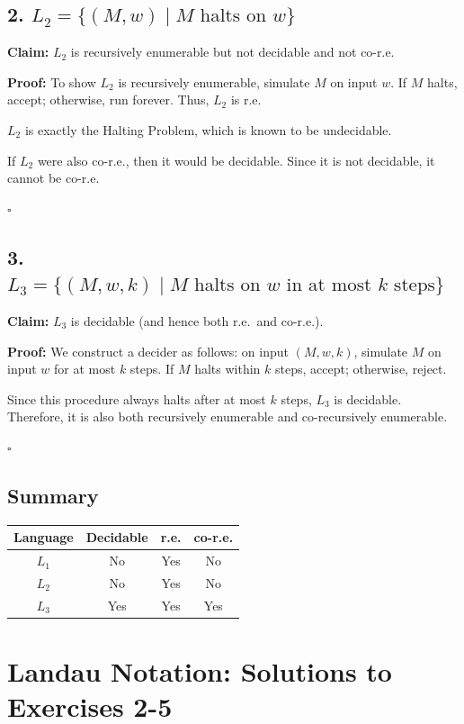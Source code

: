 \documentclass{article}
\theoremstyle{theorem}
\theoremstyle{definition}
\theoremstyle{remark}
\begin{document}
\subsection*{2. $L_2 = \{ (M,w) \mid M \text{ halts on } w \}$}

\textbf{Claim:} $L_2$ is recursively enumerable but not decidable and not co-r.e.

\textbf{Proof:}
To show $L_2$ is recursively enumerable, simulate $M$ on input $w$. If $M$ halts, accept; otherwise, run forever. Thus, $L_2$ is r.e.

$L_2$ is exactly the Halting Problem, which is known to be undecidable.

If $L_2$ were also co-r.e., then it would be decidable. Since it is not decidable, it cannot be co-r.e.

\hfill $\square$

\subsection*{3. $L_3 = \{ (M,w,k) \mid M \text{ halts on } w \text{ in at most } k \text{ steps} \}$}

\textbf{Claim:} $L_3$ is decidable (and hence both r.e.\ and co-r.e.).

\textbf{Proof:}
We construct a decider as follows: on input $(M,w,k)$, simulate $M$ on input $w$ for at most $k$ steps. If $M$ halts within $k$ steps, accept; otherwise, reject.

Since this procedure always halts after at most $k$ steps, $L_3$ is decidable. Therefore, it is also both recursively enumerable and co-recursively enumerable.

\hfill $\square$

\subsection*{Summary}

\begin{center}
\begin{tabular}{c|c|c|c}
Language & Decidable & r.e. & co-r.e. \\
\hline
$L_1$ & No & Yes & No \\
$L_2$ & No & Yes & No \\
$L_3$ & Yes & Yes & Yes \\
\end{tabular}
\end{center}

\section*{Landau Notation: Solutions to Exercises 2-5}
\end{document}

